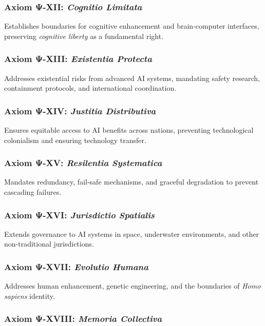 \subsubsection{Axiom Ψ-XII: \textit{Cognitio Limitata}}

Establishes boundaries for cognitive enhancement and brain-computer interfaces, preserving \textit{cognitive liberty} as a fundamental right.

\subsubsection{Axiom Ψ-XIII: \textit{Existentia Protecta}}

Addresses existential risks from advanced AI systems, mandating safety research, containment protocols, and international coordination.

\subsubsection{Axiom Ψ-XIV: \textit{Justitia Distributiva}}

Ensures equitable access to AI benefits across nations, preventing technological colonialism and ensuring technology transfer.

\subsubsection{Axiom Ψ-XV: \textit{Resilentia Systematica}}

Mandates redundancy, fail-safe mechanisms, and graceful degradation to prevent cascading failures.

\subsubsection{Axiom Ψ-XVI: \textit{Jurisdictio Spatialis}}

Extends governance to AI systems in space, underwater environments, and other non-traditional jurisdictions.

\subsubsection{Axiom Ψ-XVII: \textit{Evolutio Humana}}

Addresses human enhancement, genetic engineering, and the boundaries of \textit{Homo sapiens} identity.

\subsubsection{Axiom Ψ-XVIII: \textit{Memoria Collectiva}}

